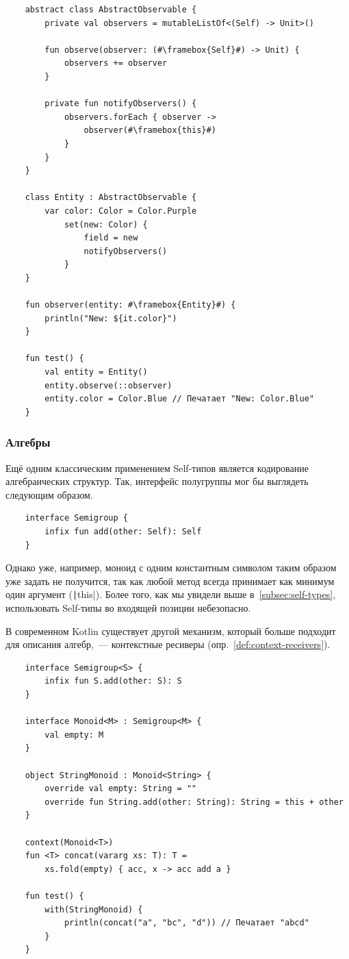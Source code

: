\begin{verbatim}
    abstract class AbstractObservable {
        private val observers = mutableListOf<(Self) -> Unit>()

        fun observe(observer: (#\framebox{Self}#) -> Unit) {
            observers += observer
        }

        private fun notifyObservers() {
            observers.forEach { observer ->
                observer(#\framebox{this}#)
            }
        }
    }

    class Entity : AbstractObservable {
        var color: Color = Color.Purple
            set(new: Color) {
                field = new
                notifyObservers()
            }
    }

    fun observer(entity: #\framebox{Entity}#) {
        println("New: ${it.color}")
    }

    fun test() {
        val entity = Entity()
        entity.observe(::observer)
        entity.color = Color.Blue // Печатает "New: Color.Blue"
    }
\end{verbatim}

\subsubsection{Алгебры} \label{subsubsec:algebras}

Ещё одним классическим применением Self-типов является кодирование алгебраических структур.
Так, интерфейс полугруппы мог бы выглядеть следующим образом.

\begin{verbatim}
    interface Semigroup {
        infix fun add(other: Self): Self
    }
\end{verbatim}

Однако уже, например, моноид с одним константным символом таким образом уже задать не получится, так как любой метод всегда принимает как минимум один аргумент (\texttt|this|).
Более того, как мы увидели выше в~\ref{subsec:self-types}, использовать Self-типы во входящей позиции небезопасно.

В современном Kotlin существует другой механизм, который больше подходит для описания алгебр,~--- контекстные ресиверы (опр.~\ref{def:context-receivers}).

\begin{verbatim}
    interface Semigroup<S> {
        infix fun S.add(other: S): S
    }

    interface Monoid<M> : Semigroup<M> {
        val empty: M
    }

    object StringMonoid : Monoid<String> {
        override val empty: String = ""
        override fun String.add(other: String): String = this + other
    }

    context(Monoid<T>)
    fun <T> concat(vararg xs: T): T =
        xs.fold(empty) { acc, x -> acc add a }

    fun test() {
        with(StringMonoid) {
            println(concat("a", "bc", "d")) // Печатает "abcd"
        }
    }
\end{verbatim}


